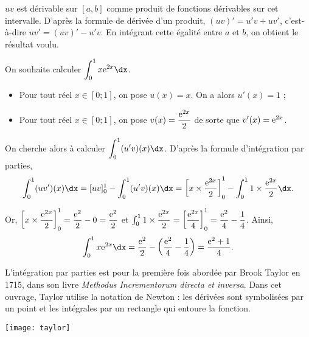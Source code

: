 \documentclass[11pt,fleqn, openany]{book} %
\begin{document}
\begin{demonstration}$uv$ est dérivable sur $[a,b]$ comme produit de fonctions dérivables sur cet intervalle. D'après la formule de dérivée d'un produit, $(uv)'=u'v+uv'$, c'est-à-dire $uv'=(uv)'-u'v$. En intégrant cette égalité entre $a$ et $b$, on obtient le résultat voulu.\end{demonstration}

\begin{example} On souhaite calculer $\displaystyle\int_{0}^1x\e^{2x} \dx$.
\begin{itemize}
\item Pour tout réel $x\in[0;1]$, on pose $u(x)=x$. On a alors $u'(x)=1$ ;
\item Pour tout réel $x\in[0;1]$, on pose $v(x)=\dfrac{\mathrm{e}^{2x}}{2}$ de sorte que $v'(x)=\mathrm{e}^{2x}$.
\end{itemize}

On cherche alors à calculer $\displaystyle\int_{0}^1 (u'v)(x)\dx$. D'après la formule d'intégration par parties,\[\displaystyle\int_{0}^1 (uv')(x)\dx=[uv]_0^1-\displaystyle\int_{0}^1 (u'v)(x)\dx = \left[x \times \dfrac{\e^{2x}}{2} \right]_0^1-\displaystyle\int_{0}^1 1 \times \dfrac{\e^{2x}}{2} \dx.\]

Or, $\left[x \times \dfrac{\mathrm{e}^{2x}}{2} \right]_0^1=\dfrac{\mathrm{e}^2}{2}-0=\dfrac{\mathrm{e}^2}{2}$ et $\int_{0}^1 1 \times \dfrac{\mathrm{e}^{2x}}{2} = \left[\dfrac{\mathrm{e}^{2x}}{4}\right]_0^1=  \dfrac{\mathrm{e}^2}{4}-\dfrac{1}{4}$.
Ainsi,
 \[\displaystyle\int_{0}^1x\e^{2x} \dx = \dfrac{\e^2}{2}-\left(\dfrac{\e^2}{4}-\dfrac{1}{4}\right)=\dfrac{\e^2+1}{4}.\]
\end{example}

L'intégration par parties est pour la première fois abordée par Brook Taylor en 1715, dans son livre \textit{Methodus Incrementorum directa et inversa}. Dans cet ouvrage, Taylor utilise la notation de Newton : les dérivées sont symbolisées par un point et les intégrales par un rectangle qui entoure la fonction. 

\begin{center}
\texttt{[image: taylor]}
\end{center}
\end{document}
